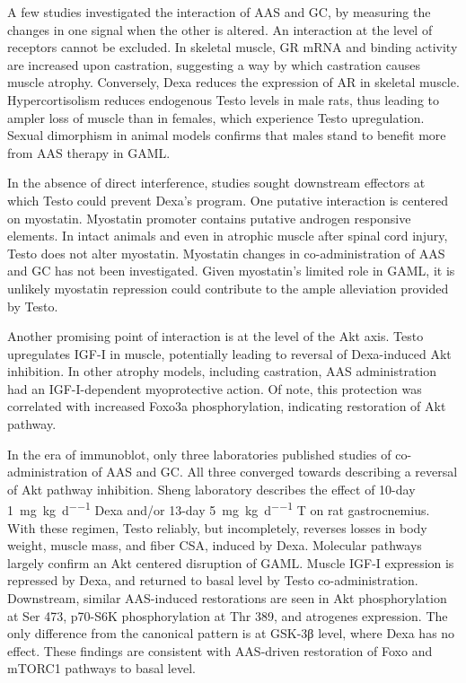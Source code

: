 \documentclass[12pt,english]{report}\usepackage[]{graphicx}\usepackage[]{color}
\begin{document}
A few studies investigated the interaction of AAS and GC, by measuring
the changes in one signal when the other is altered. An interaction
at the level of receptors cannot be excluded. In skeletal muscle,
GR mRNA and binding activity are increased upon castration\citep{ye2014transcriptional,dubois1984perineal},
suggesting a way by which castration causes muscle atrophy. Conversely,
Dexa reduces the expression of AR in skeletal muscle\citep{inder2010dexamethasone}.
Hypercortisolism reduces endogenous Testo levels in male rats, thus
leading to ampler loss of muscle than in females, which experience
Testo upregulation\citep{prezant1997gender-specific}. Sexual dimorphism
in animal models confirms that males stand to benefit more from AAS
therapy in GAML.

In the absence of direct interference, studies sought downstream effectors
at which Testo could prevent Dexa's program. One putative interaction
is centered on myostatin. Myostatin promoter contains putative androgen
responsive elements\citep{ma2003glucocorticoid-induced}. In intact
animals and even in atrophic muscle after spinal cord injury, Testo
does not alter myostatin\citep{rigamonti2009muscle,wu2012nandrolone}.
Myostatin changes in co-administration of AAS and GC has not been
investigated. Given myostatin's limited role in GAML, it is unlikely
myostatin repression could contribute to the ample alleviation provided
by Testo.

Another promising point of interaction is at the level of the Akt
axis. Testo upregulates IGF-I in muscle, potentially leading to reversal
of Dexa-induced Akt inhibition. In other atrophy models, including
castration, AAS administration had an IGF-I-dependent myoprotective
action\citep{serra2013effects}. Of note, this protection was correlated
with increased Foxo3a phosphorylation, indicating restoration of Akt
pathway.

In the era of immunoblot, only three laboratories published studies
of co-administration of AAS and GC. All three converged towards describing
a reversal of Akt pathway inhibition. Sheng laboratory describes the
effect of 10-day \SI{1}{\milli\gram\per\kilo\gram\per\day} Dexa and/or
13-day \SI{5}{\milli\gram\per\kilo\gram\per\day} T\citep{yin2009regulation}
on rat gastrocnemius. With these regimen, Testo reliably, but incompletely,
reverses losses in body weight, muscle mass, and fiber CSA, induced
by Dexa. Molecular pathways largely confirm an Akt centered disruption
of GAML. Muscle IGF-I expression is repressed by Dexa, and returned
to basal level by Testo co-administration. Downstream, similar AAS-induced
restorations are seen in Akt phosphorylation at Ser 473, p70-S6K phosphorylation
at Thr 389, and atrogenes expression. The only difference from the
canonical pattern is at GSK-3β level, where Dexa has no effect. These
findings are consistent with AAS-driven restoration of Foxo and mTORC1
pathways to basal level.
\end{document}
